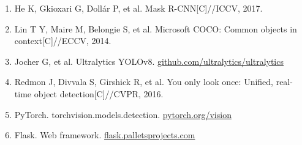 \documentclass[12pt,a4paper]{article}
\begin{document}
\begin{enumerate}
  \item He K, Gkioxari G, Dollár P, et al. Mask R-CNN[C]//ICCV, 2017.
  \item Lin T Y, Maire M, Belongie S, et al. Microsoft COCO: Common objects in context[C]//ECCV, 2014.
  \item Jocher G, et al. Ultralytics YOLOv8. \href{https://github.com/ultralytics/ultralytics}{github.com/ultralytics/ultralytics}
  \item Redmon J, Divvala S, Girshick R, et al. You only look once: Unified, real-time object detection[C]//CVPR, 2016.
  \item PyTorch. torchvision.models.detection. \href{https://pytorch.org/vision/stable/models.html}{pytorch.org/vision}
  \item Flask. Web framework. \href{https://flask.palletsprojects.com/}{flask.palletsprojects.com}
\end{enumerate}
\end{document}
